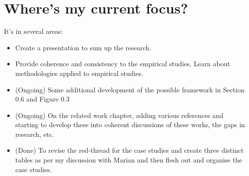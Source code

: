 \section{Where's my current focus?}
It's in several areas:
\begin{itemize}
    \item Create a presentation to sum up the research.
    \item Provide coherence and consistency to the empirical studies. Learn about methodologies applied to empirical studies.
    \item (Ongoing) Some additional development of the possible framework in Section 0.6 and Figure 0.3
    \item (Ongoing) On the related work chapter, adding various references and starting to develop these into coherent discussions of these works, the gaps in research, etc.
    \item (Done) To revise the red-thread for the case studies and create three distinct tables as per my discussion with Marian and then flesh out and organise the case studies.
\end{itemize}

